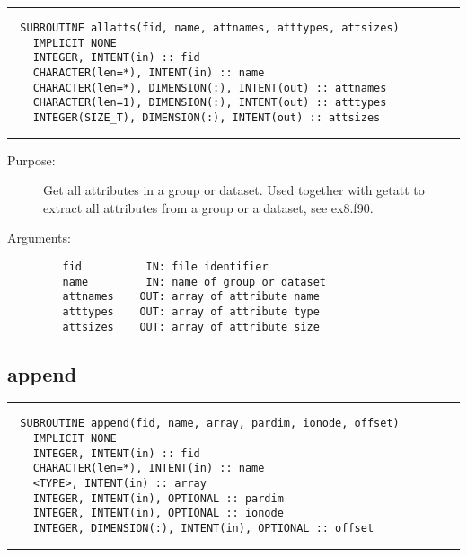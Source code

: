 \documentclass[a4paper]{article}
\begin{document}
\par
\addvspace{\medskipamount}
\nopagebreak\hrule
\begin{verbatim}
  SUBROUTINE allatts(fid, name, attnames, atttypes, attsizes)
    IMPLICIT NONE
    INTEGER, INTENT(in) :: fid
    CHARACTER(len=*), INTENT(in) :: name
    CHARACTER(len=*), DIMENSION(:), INTENT(out) :: attnames
    CHARACTER(len=1), DIMENSION(:), INTENT(out) :: atttypes
    INTEGER(SIZE_T), DIMENSION(:), INTENT(out) :: attsizes
\end{verbatim}
\nopagebreak\hrule
\addvspace{\medskipamount}

\begin{description}
\item[Purpose:] \mbox{}

Get all attributes in a group or dataset. Used together with
{\ttfamily getatt} to extract all attributes from a group or a dataset, see {\ttfamily ex8.f90}.

\item[Arguments:] \mbox{}

\begin{verbatim}
   fid          IN: file identifier
   name         IN: name of group or dataset
   attnames    OUT: array of attribute name
   atttypes    OUT: array of attribute type
   attsizes    OUT: array of attribute size

\end{verbatim}


\end{description}





\subsection{append}

\par
\addvspace{\medskipamount}
\nopagebreak\hrule
\begin{verbatim}
  SUBROUTINE append(fid, name, array, pardim, ionode, offset)
    IMPLICIT NONE
    INTEGER, INTENT(in) :: fid
    CHARACTER(len=*), INTENT(in) :: name
    <TYPE>, INTENT(in) :: array
    INTEGER, INTENT(in), OPTIONAL :: pardim
    INTEGER, INTENT(in), OPTIONAL :: ionode
    INTEGER, DIMENSION(:), INTENT(in), OPTIONAL :: offset
\end{verbatim}
\nopagebreak\hrule
\addvspace{\medskipamount}
\end{document}
